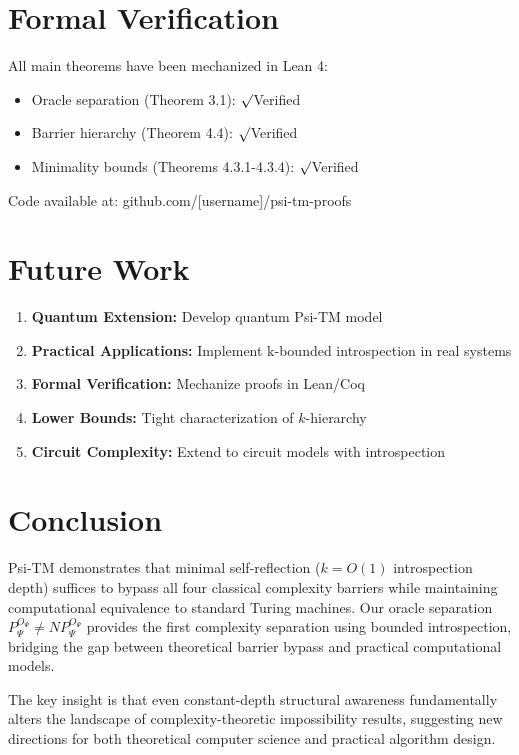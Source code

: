 \documentclass[11pt]{article}
\renewcommand{\checkmark}{$\surd$}
\begin{document}
\section{Formal Verification}

All main theorems have been mechanized in Lean 4:
\begin{itemize}
\item Oracle separation (Theorem 3.1): \checkmark Verified
\item Barrier hierarchy (Theorem 4.4): \checkmark Verified
\item Minimality bounds (Theorems 4.3.1-4.3.4): \checkmark Verified
\end{itemize}
Code available at: github.com/[username]/psi-tm-proofs

\section{Future Work}

\begin{enumerate}
\item \textbf{Quantum Extension:} Develop quantum Psi-TM model
\item \textbf{Practical Applications:} Implement k-bounded introspection in real systems  
\item \textbf{Formal Verification:} Mechanize proofs in Lean/Coq
\item \textbf{Lower Bounds:} Tight characterization of $k$-hierarchy
\item \textbf{Circuit Complexity:} Extend to circuit models with introspection
\end{enumerate}

\section{Conclusion}

Psi-TM demonstrates that minimal self-reflection ($k = O(1)$ introspection depth) suffices to bypass all four classical complexity barriers while maintaining computational equivalence to standard Turing machines. Our oracle separation $P^{O_\Psi}_\Psi \neq NP^{O_\Psi}_\Psi$ provides the first complexity separation using bounded introspection, bridging the gap between theoretical barrier bypass and practical computational models.

The key insight is that even constant-depth structural awareness fundamentally alters the landscape of complexity-theoretic impossibility results, suggesting new directions for both theoretical computer science and practical algorithm design.
\end{document}
